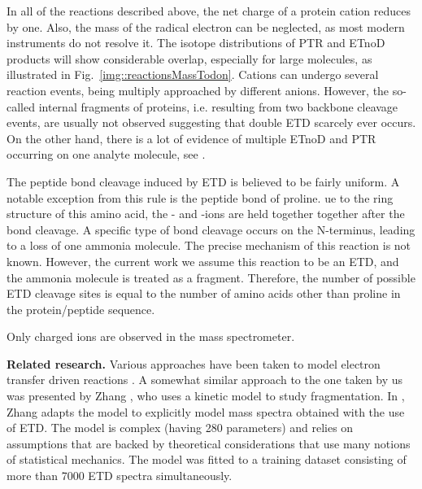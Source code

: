 \documentclass{llncs}
\begin{document}
        In all of the reactions described above, the net charge of a protein cation reduces by one. Also, the mass of the radical electron can be neglected, as most modern instruments do not resolve it. The isotope distributions of PTR and ETnoD products will show considerable overlap, especially for large molecules, as illustrated in Fig.~\ref{img::reactionsMassTodon}. Cations can undergo several reaction events, being multiply approached by different anions. However, the so-called internal fragments of proteins, i.e. resulting from two backbone cleavage events, are usually not observed suggesting that double ETD scarcely ever occurs. On the other hand, there is a lot of evidence of multiple ETnoD and PTR occurring on one analyte molecule, see \cite{Lermyte2015-li}.


        The peptide bond cleavage induced by ETD is believed to be fairly uniform. A notable exception from this rule is the peptide bond of proline. ue to the ring structure of this amino acid, the - and -ions are held together together after the  bond cleavage. A specific type of  bond cleavage occurs on the N-terminus, leading to a loss of one ammonia molecule. The precise mechanism of this reaction is not known. However, the current work we assume this reaction to be an ETD, and the ammonia molecule is treated as a  fragment. Therefore, the number of possible ETD cleavage sites is equal to the number of amino acids other than proline in the protein/peptide sequence.

        Only charged ions are observed in the mass spectrometer.

\textbf{Related research.}
        Various approaches have been taken to model electron transfer driven reactions \cite{Breuker2004-az,Simons2010-gy,Zhurov2013-ua,Turecek2013-fq}. A somewhat similar approach to the one taken by us was presented by Zhang \cite{Zhang2004-fp,Zhang2005-jn,Zhang2011-lg}, who uses a kinetic model to study fragmentation. In \cite{Zhang2010-fp}, Zhang adapts the model to explicitly model mass spectra obtained with the use of ETD. The model is complex (having 280 parameters) and relies on assumptions that are backed by theoretical considerations that use many notions of statistical mechanics. The model was fitted to a training dataset consisting of more than 7000 ETD spectra simultaneously.
\end{document}
